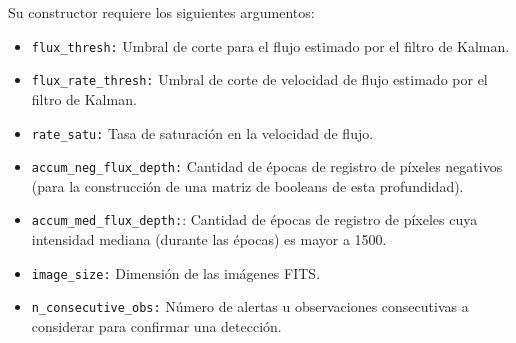 Su constructor requiere los siguientes argumentos:
\begin{itemize}
\item \texttt{flux\_thresh:} Umbral de corte para el flujo estimado por el filtro de Kalman.
\item \texttt{flux\_rate\_thresh:} Umbral de corte de velocidad de flujo estimado por el filtro de Kalman.
\item \texttt{rate\_satu:} Tasa de saturaci\'on en la velocidad de flujo.
\item \texttt{accum\_neg\_flux\_depth:} Cantidad de \'epocas de registro de p\'ixeles negativos (para la construcci\'on de una matriz de booleans de esta profundidad).
\item \texttt{accum\_med\_flux\_depth:}: Cantidad de \'epocas de registro de p\'ixeles cuya intensidad mediana (durante las \'epocas) es mayor a 1500.
\item \texttt{image\_size:} Dimensi\'on de las im\'agenes FITS.
\item \texttt{n\_consecutive\_obs:} N\'umero de alertas u observaciones consecutivas a considerar para confirmar una detecci\'on.

\end{itemize}
